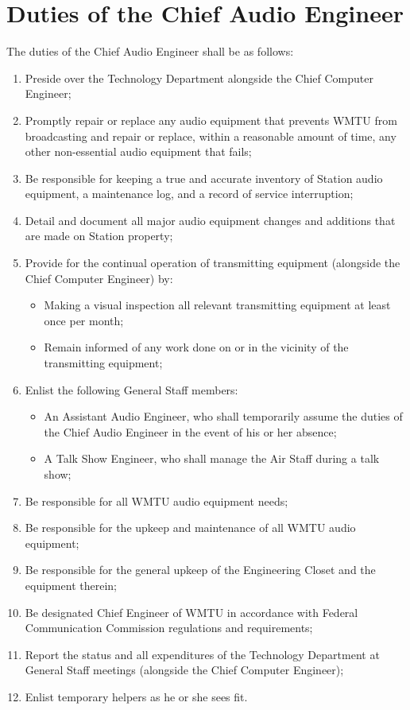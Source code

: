 \documentclass[12pt]{constitution}
\begin{document}
\section{​Duties of the Chief Audio Engineer}
The duties of the Chief Audio Engineer shall be as follows:
\begin{enumerate}
\item Preside over the Technology Department alongside the Chief Computer Engineer;
\item Promptly repair or replace any audio equipment that prevents WMTU from broadcasting and repair or replace, within a reasonable amount of time, any other non-­essential audio equipment that fails;
\item Be responsible for keeping a true and accurate inventory of Station audio equipment, a maintenance log, and a record of service interruption;
\item Detail and document all major audio equipment changes and additions that are made on Station property;
\item Provide for the continual operation of transmitting equipment (alongside the Chief Computer Engineer) by:
\begin{itemize}
\item Making a visual inspection all relevant transmitting equipment at least once per month;
\item Remain informed of any work done on or in the vicinity of the transmitting equipment;
\end{itemize}
\item Enlist the following General Staff members:
\begin{itemize}
\item An Assistant Audio Engineer, who shall temporarily assume the duties of the Chief Audio Engineer in the event of his or her absence;
\item A Talk Show Engineer, who shall manage the Air Staff during a talk show;
\end{itemize}
\item Be responsible for all WMTU audio equipment needs;
\item Be responsible for the upkeep and maintenance of all WMTU audio equipment;
\item Be responsible for the general upkeep of the Engineering Closet and the equipment therein;
\item Be designated Chief Engineer of WMTU in accordance with Federal Communication Commission regulations and requirements;
\item Report the status and all expenditures of the Technology Department at General Staff meetings (alongside the Chief Computer Engineer);
\item Enlist temporary helpers as he or she sees fit.
\end{enumerate}
\end{document}
